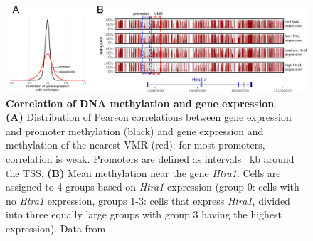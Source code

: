 \documentclass[twocolumn,10pt]{article}
\begin{document}
\begin{figure}
	\begin{center}
		\includegraphics[width=\textwidth]{figures/Fig_correlation.png}
	\end{center}
	\caption{\small \textbf{Correlation of DNA methylation and gene expression}.\\
		\textbf{(A)} Distribution of Pearson correlations between gene expression and promoter methylation (black) and gene expression and methylation of the nearest VMR (red): for most promoters, correlation is weak.
        Promoters are defined as intervals ~kb around the TSS.
		\textbf{(B)} Mean methylation near the gene \textit{Htra1}.
		Cells are assigned to 4 groups based on \textit{Htra1} expression (group 0: cells with no \textit{Htra1} expression, groups 1-3: cells that express \textit{Htra1}, divided into three equally large groups with group 3 having the highest expression).
		Data from \citet{kremer_scnmt}.}
	\label{fig:correlation}
\end{figure}
\end{document}
